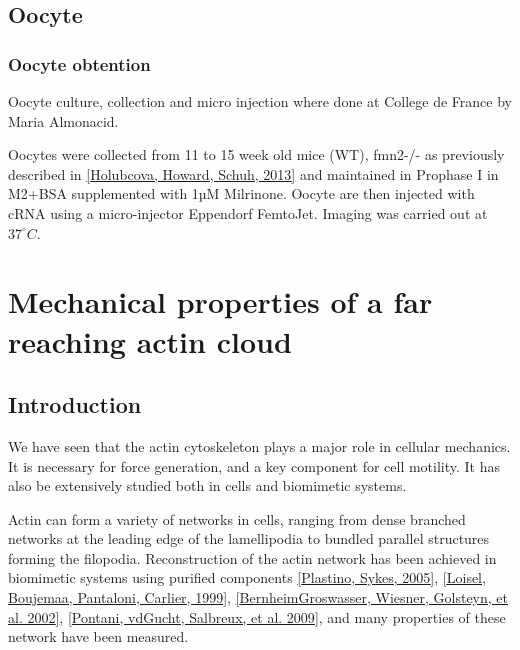 \documentclass[A4paperpaper,11pt,english]{sphinxmanual}
\begin{document}
\section{Oocyte}
\label{index-latex:oocyte}

\subsection{Oocyte obtention}
\label{index-latex:oocyte-obtention}
Oocyte culture, collection and micro injection where done at College de France by Maria Almonacid.

Oocytes were collected from 11 to 15 week old mice (WT), fmn2-/- as previously
described in {\hyperref[index-latex:holubcova2013]{{[}Holubcova, Howard, Schuh,  2013{]}}} and maintained in Prophase I in M2+BSA
supplemented with  1µM Milrinone. Oocyte are then injected with cRNA  using a
micro-injector Eppendorf FemtoJet. Imaging was carried out at \(37^\circ{}C\).


\chapter{Mechanical properties of a far reaching actin cloud}
\label{index-latex::doc}\label{index-latex:mechanical-properties-of-a-far-reaching-actin-cloud}

\section{Introduction}
\label{index-latex:introduction}
We have seen that the actin cytoskeleton plays a major role in
cellular mechanics. It is necessary for force generation, and a
key component for cell motility. It has also be extensively studied both in
cells and biomimetic systems.

Actin can form a variety of networks in cells, ranging from dense branched
networks at the leading edge of the lamellipodia to bundled parallel structures
forming the filopodia.  Reconstruction of the actin network has been achieved in
biomimetic systems using purified components {\hyperref[index-latex:plastino2005]{{[}Plastino, Sykes,  2005{]}}},
{\hyperref[index-latex:loisel1999]{{[}Loisel, Boujemaa, Pantaloni, Carlier,  1999{]}}}, {\hyperref[index-latex:bernheim-groswasser2002]{{[}BernheimGroswasser, Wiesner, Golsteyn,  et al.  2002{]}}},  {\hyperref[index-latex:pontani2009]{{[}Pontani, vdGucht, Salbreux,  et al.  2009{]}}}, and
many properties of these network have been measured.
\end{document}
